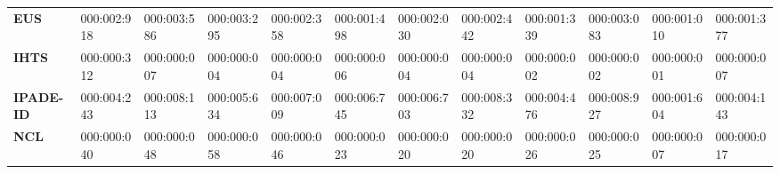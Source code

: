 {{\begin{tabular}{llllllllllll}
\textbf{EUS}                  & 000:002:918                                                                            & 000:003:586                                                                          & 000:003:295                         & 000:002:358                           & 000:001:498                                                                                      & 000:002:030                           & 000:002:442                           & 000:001:339                           & 000:003:083                            & 000:001:010                         & 000:001:377                                                                          \\
\textbf{IHTS}                 & 000:000:312                                                                            & 000:000:007                                                                          & 000:000:004                         & 000:000:004                           & 000:000:006                                                                                      & 000:000:004                           & 000:000:004                           & 000:000:002                           & 000:000:002                            & 000:000:001                         & 000:000:007                                                                          \\
\textbf{IPADE-ID}             & 000:004:243                                                                            & 000:008:113                                                                          & 000:005:634                         & 000:007:009                           & 000:006:745                                                                                      & 000:006:703                           & 000:008:332                           & 000:004:476                           & 000:008:927                            & 000:001:604                         & 000:004:143                                                                          \\
\textbf{NCL}                  & 000:000:040                                                                            & 000:000:048                                                                          & 000:000:058                         & 000:000:046                           & 000:000:023                                                                                      & 000:000:020                           & 000:000:020                           & 000:000:026                           & 000:000:025                            & 000:000:007                         & 000:000:017                                                                          \\

\end{tabular}}}
